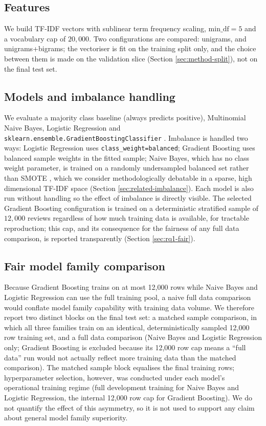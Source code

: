 \documentclass[11pt,a4paper,DIV=12]{scrartcl}
\begin{document}
\subsection{Features}
We build TF-IDF vectors with sublinear term frequency scaling, $\mathrm{min\_df}=5$
and a vocabulary cap of $20{,}000$. Two configurations are compared: unigrams,
and unigrams+bigrams; the vectoriser is fit on the training split only, and the
choice between them is made on the validation slice (Section
\ref{sec:method-split}), not on the final test set.

\subsection{Models and imbalance handling}
We evaluate a majority class baseline (always predicts positive),
Multinomial Naive Bayes, Logistic Regression and
\texttt{sklearn.ensemble.GradientBoostingClassifier}
\citep{friedman2001greedy,pedregosa2011scikit}. Imbalance is handled two ways:
Logistic Regression uses \texttt{class\_weight=balanced}; Gradient Boosting uses
balanced sample weights in the fitted sample; Naive Bayes, which has no
class weight parameter, is trained on a randomly undersampled balanced set
rather than SMOTE \citep{chawla2002smote}, which we consider methodologically
debatable in a sparse, high dimensional TF-IDF space (Section
\ref{sec:related-imbalance}). Each model is also run without handling so the
effect of imbalance is directly visible. The selected Gradient Boosting
configuration is trained on a deterministic stratified sample of $12{,}000$
reviews regardless of how much training data is available, for tractable
reproduction; this cap, and its consequence for the fairness of any
full data comparison, is reported transparently (Section \ref{sec:rq1-fair}).

\subsection{Fair model family comparison}
\label{sec:method-fair}
Because Gradient Boosting trains on at most 12,000 rows while Naive Bayes and
Logistic Regression can use the full training pool, a naive full data
comparison would conflate model family capability with
training data volume. We therefore report two distinct blocks on the
final test set: a matched sample comparison, in which all three
families train on an identical, deterministically sampled 12,000 row training
set, and a full data comparison (Naive Bayes and Logistic Regression
only; Gradient Boosting is excluded because its 12,000 row cap means a
``full data'' run would not actually reflect more training data than the
matched comparison).
The matched sample block equalises the final training rows; hyperparameter
selection, however, was conducted under each model's operational training
regime (full development training for Naive Bayes and Logistic Regression, the internal
12,000 row cap for Gradient Boosting). We do not quantify the effect of this
asymmetry, so it is not used to support any claim about general model family
superiority.
\end{document}
